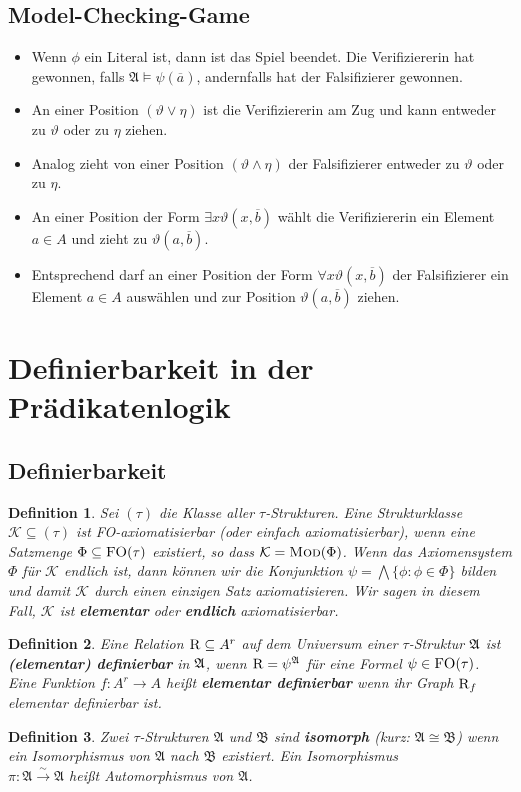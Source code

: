 \documentclass[12pt,a4paper]{article}
\newtheorem{defi}{Definition}[section]
\begin{document}
\subsection{Model-Checking-Game}
	\begin{itemize}
		\item Wenn $\phi$ ein Literal ist, dann ist das Spiel beendet. Die Verifiziererin hat gewonnen, falls $\mathfrak{A}\models\psi(\overline{a})$, andernfalls hat der Falsifizierer gewonnen.
		\item An einer Position $(\vartheta\vee\eta)$ ist die Verifiziererin am Zug und kann entweder zu $\vartheta$ oder zu $\eta$ ziehen.
		\item Analog zieht von einer Position $(\vartheta\wedge\eta)$ der Falsifizierer entweder zu $\vartheta$ oder zu $\eta$.
		\item An einer Position der Form $\exists x\vartheta(x,\overline{b})$ wählt die Verifiziererin ein Element $a\in A$ und zieht zu $\vartheta(a,\overline{b})$.
		\item Entsprechend darf an einer Position der Form $\forall x\vartheta(x,\overline{b})$ der Falsifizierer ein Element $a\in A$ auswählen und zur Position $\vartheta(a,\overline{b})$ ziehen.
	\end{itemize}
\newpage
\section{Definierbarkeit in der Prädikatenlogik}
\subsection{Definierbarkeit}
	\begin{defi}
		Sei $(\tau)$ die Klasse aller $\tau$-Strukturen. Eine Strukturklasse $\mathcal{K}\subseteq(\tau)$ ist \textsc{FO}-axiomatisierbar (oder einfach axiomatisierbar), wenn eine Satzmenge $\Phi\subseteq\textsc{FO}(\tau)$ existiert, so dass $\mathcal{K}=\textsc{Mod}(\Phi)$. Wenn das Axiomensystem $\Phi$ für $\mathcal{K}$ endlich ist, dann können wir die Konjunktion $\psi=\bigwedge\lbrace\phi :\phi\in\Phi\rbrace$ bilden und damit $\mathcal{K}$ durch einen einzigen Satz axiomatisieren. Wir sagen in diesem Fall, $\mathcal{K}$ ist \textbf{elementar} oder \textbf{endlich} axiomatisierbar.
	\end{defi}
	\begin{defi}
		Eine Relation $\textsc{R}\subseteq A^r$ auf dem Universum einer $\tau$-Struktur $\mathfrak{A}$ ist \textbf{(elementar) definierbar} in $\mathfrak{A}$, wenn $\textsc{R}=\psi^{\mathfrak{A}}$ für eine Formel $\psi\in\textsc{FO}(\tau)$.\\
		Eine Funktion $f: A^r\rightarrow A$ heißt \textbf{elementar definierbar} wenn ihr Graph $\textsc{R}_f$ elementar definierbar ist.
	\end{defi}
	\begin{defi}
		Zwei $\tau$-Strukturen $\mathfrak{A}$ und $\mathfrak{B}$ sind \textbf{isomorph} (kurz: $\mathfrak{A}\cong\mathfrak{B}$) wenn ein Isomorphismus von $\mathfrak{A}$ nach $\mathfrak{B}$ existiert. Ein Isomorphismus\\ $\pi : \mathfrak{A}\stackrel{\sim}{\rightarrow}\mathfrak{A}$ heißt Automorphismus von $\mathfrak{A}$.
	\end{defi}
\end{document}
